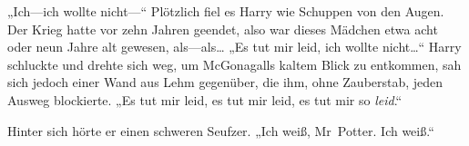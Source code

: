 „Ich—ich wollte nicht—“ Plötzlich fiel es Harry wie Schuppen von den Augen. Der Krieg hatte vor zehn Jahren geendet, also war dieses Mädchen etwa acht oder neun Jahre alt gewesen, als—als…
„Es tut mir leid, ich wollte nicht…“ Harry schluckte und drehte sich weg, um McGonagalls kaltem Blick zu entkommen, sah sich jedoch einer Wand aus Lehm gegenüber, die ihm, ohne Zauberstab, jeden Ausweg blockierte. „Es tut mir leid, es tut mir leid, es tut mir so \emph{leid}.“

Hinter sich hörte er einen schweren Seufzer. „Ich weiß, Mr~Potter. Ich weiß.“


